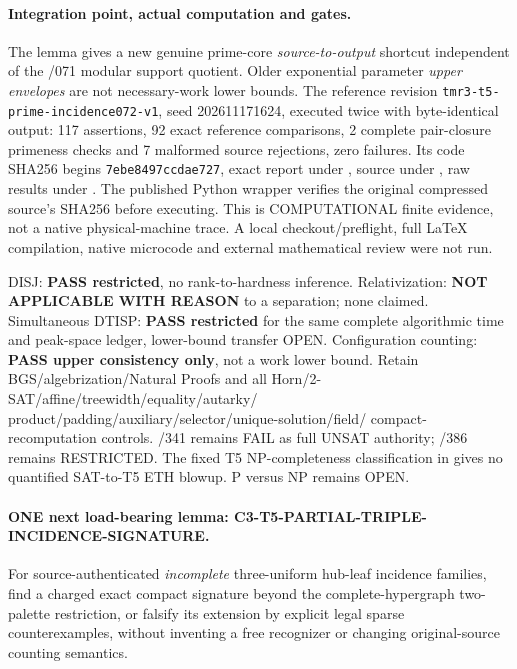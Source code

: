 \documentclass[11pt]{article}
\begin{document}
\paragraph{Integration point, actual computation and gates.}
The lemma gives a new genuine prime-core \emph{source-to-output}
shortcut independent of the /071 modular support quotient.
Older exponential parameter \emph{upper envelopes} are
not necessary-work lower bounds. The reference revision
\texttt{tmr3-t5-prime-incidence072-v1}, seed 202611171624,
executed twice with byte-identical output: 117 assertions,
92 exact reference comparisons, 2 complete pair-closure
primeness checks and 7 malformed source rejections, zero
failures. Its code SHA256 begins
\texttt{7ebe8497ccdae727}, exact report under
,
source under
,
raw results under
.
The published Python wrapper verifies the original compressed
source's SHA256 before executing. This is COMPUTATIONAL
finite evidence, not a native physical-machine trace.
A local checkout/preflight, full LaTeX compilation, native
microcode and external mathematical review were not run.

DISJ: \textbf{PASS restricted}, no rank-to-hardness
inference. Relativization: \textbf{NOT APPLICABLE WITH REASON}
to a separation; none claimed. Simultaneous DTISP:
\textbf{PASS restricted} for the same complete algorithmic
time and peak-space ledger, lower-bound transfer OPEN.
Configuration counting: \textbf{PASS upper consistency only},
not a work lower bound. Retain BGS/algebrization/Natural
Proofs and all Horn/2-SAT/affine/treewidth/equality/autarky/
product/padding/auxiliary/selector/unique-solution/field/
compact-recomputation controls. /341 remains FAIL as full
UNSAT authority; /386 remains RESTRICTED.
The fixed T5 NP-completeness classification in
\cite{BangJensenHellMacGillivray1988} gives no quantified
SAT-to-T5 ETH blowup. P versus NP remains OPEN.

\paragraph{ONE next load-bearing lemma:
C3-T5-PARTIAL-TRIPLE-INCIDENCE-SIGNATURE.}
For source-authenticated \emph{incomplete} three-uniform
hub-leaf incidence families, find a charged exact compact
signature beyond the complete-hypergraph two-palette
restriction, or falsify its extension by explicit legal
sparse counterexamples, without inventing a free
recognizer or changing original-source counting semantics.
\end{document}
